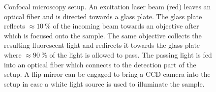 		\begin{figure}[htb]
			\centering
			\caption[Confocal microscopy setup]{Confocal microscopy setup. An excitation laser beam (red) leaves an optical fiber and is directed towards a glass plate. The glass plate reflects $\approx \SI{10}{\percent}$ of the incoming beam towards an objective after which is focused onto the sample. The same objective collects the resulting fluorescent light and redirects it towards the glass plate where $\approx \SI{90}{\percent}$ of the light is allowed to pass. The passing \fl light is fed into an optical fiber which connects to the detection part of the setup. A flip mirror can be engaged to bring a CCD camera into the setup in case a white light source is used to illuminate the sample.}
			\label{fig::confocal_setup}
		\end{figure}

